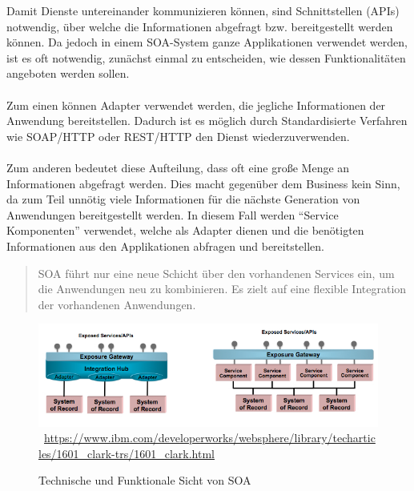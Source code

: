 Damit Dienste untereinander kommunizieren können, sind Schnittstellen (APIs) notwendig, über welche die Informationen abgefragt bzw. bereitgestellt werden können. Da jedoch in einem SOA-System ganze Applikationen verwendet werden, ist es oft notwendig, zunächst einmal zu entscheiden, wie dessen Funktionalitäten angeboten werden sollen.
\\\\
Zum einen können Adapter verwendet werden, die jegliche Informationen der Anwendung bereitstellen. Dadurch ist es möglich durch Standardisierte Verfahren wie SOAP/HTTP oder REST/HTTP den Dienst wiederzuverwenden.
\\\\
Zum anderen bedeutet diese Aufteilung, dass oft eine große Menge an Informationen abgefragt werden. Dies macht gegenüber dem Business kein Sinn, da zum Teil unnötig viele Informationen für die nächste Generation von Anwendungen bereitgestellt werden. In diesem Fall werden "`Service Komponenten"' verwendet, welche als Adapter dienen und die benötigten Informationen aus den Applikationen abfragen und bereitstellen.
\begin{quotation}
	\frqq SOA führt nur eine neue Schicht über den vorhandenen Services ein, um die Anwendungen neu zu kombinieren. Es zielt auf eine flexible Integration der vorhandenen Anwendungen.\flqq\ \cite[S. 92]{EWolff2016:Microservices}
\end{quotation}

\begin{figure}[htb]
    \centering 
    \includegraphics[width=\linewidth]{content/images/figure2}\
    \quelle\url{https://www.ibm.com/developerworks/websphere/library/techarticles/1601_clark-trs/1601_clark.html}
    \caption{Technische und Funktionale Sicht von SOA}
    \label{fig:TechnicalAndFunctionalViewsOfSOA} 
\end{figure}

